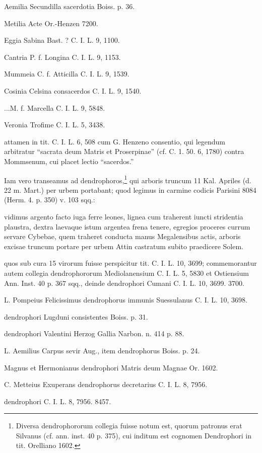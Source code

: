 \documentclass[a4paper, 11pt, oneside, polutonikogreek, german]{article}
\begin{document}
Aemilia Secundilla sacerdotia Boiss. p. 36.

Metilia Acte Or.-Henzen 7200.

Eggia Sabina Bast. ? C. I. L. 9, 1100.

Cantria P. f. Longina C. I. L. 9, 1153.

Mummeia C. f. Atticilla C. I. L. 9, 1539.

Cosinia Celsina consacerdos C. I. L. 9, 1540.

...M. f. Marcella C. I. L. 9, 5848.

Veronia Trofime C. I. L. 5, 3438.

attamen in tit. C. I. L. 6, 508 cum G. Henzeno consentio, qui legendum arbitratur "`sacrata deum Matris et Proserpinae"' (cf. C. 1. 50. 6, 1780) contra Mommsenum, cui placet lectio "`sacerdos."'

Iam vero transeamus ad dendrophoros,\footnote{Diversa dendrophororum collegia fuisse notum est, quorum patronus erat Silvanus (cf. ann. inst. 40 p. 375), cui inditum est cognomen Dendrophori in tit. Orelliano 1602.} qui arboris truncum 11 Kal. Apriles (d. 22 m. Mart.) per urbem portabant; quod legimus in carmine codicis Parisini 8084 (Herm. 4. p. 350) v. 103 sqq.:

vidimus argento facto iuga ferre leones,  lignea cum traherent iuncti stridentia plaustra,  dextra laevaque istum argentea frena tenere,  egregios proceres currum servare Cybebae,  quem traheret conducta manus Megalensibus actis,  arboris excisae truncum portare per urbem  Attin castratum subito praedicere Solem.

quos sub cura 15 virorum fuisse perspicitur tit. C. I. L. 10, 3699; commemorantur autem collegia dendrophororum Mediolanensium C. I. L. 5, 5830 et Ostiensium Ann. Inst. 40 p. 367 sqq., deinde dendrophori Cumani C. I. L. 10, 3699. 3700.

L. Pompeius Felicissimus dendrophorus immunis Suessulanus C. I. L. 10, 3698.

dendrophori Lugduni consistentes Boiss. p. 31.

dendrophori Valentini Herzog Gallia Narbon. n. 414 p. 88.

L. Aemilius Carpus sevir Aug., item dendrophorus Boiss. p. 24.

Magnus et Hermonianus dendrophori Matris deum Magnae Or. 1602.

C. Metteius Exuperans dendrophorus decretarius C. I. L. 8, 7956.

dendrophori C. I. L. 8, 7956. 8457.
\end{document}
